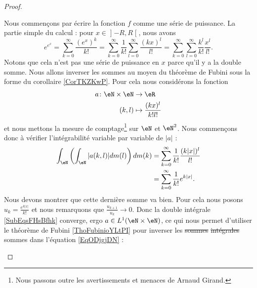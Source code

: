 \begin{proof}
\begin{enumerate}
                    Nous commençons par écrire la fonction \( f\) comme une série de puissance. La partie simple du calcul : pour \( x\in \mathopen] -R , R \mathclose[\), nous avons
                        \begin{equation}    \label{EqODjgjDN}
                        e^{e^x}=\sum_{k=0}^{\infty}\frac{ (e^x)^k }{ k! }=\sum_{k=0}^{\infty}\frac{1}{ k! }\sum_{l=0}^{\infty}\frac{ (kx)^l }{ l! }=\sum_{k=0}^{\infty}\sum_{l=0}^{\infty}\frac{k^l}{k! }\frac{ x^l }{ l! }.
                    \end{equation}
                    Notons que cela n'est pas une série de puissance en \( x\) parce qu'il y a la double somme. Nous allons inverser les sommes au moyen du théorème de Fubini sous la forme du corollaire \ref{CorTKZKwP}. Pour cela nous considérons la fonction
                    \begin{equation}
                        \begin{aligned}
                            a\colon \eN\times \eN&\to \eR \\
                            (k,l)&\mapsto \frac{ (kx)^l }{ k!l! } 
                        \end{aligned}
                    \end{equation}
                    et nous mettons la mesure de comptage\footnote{Nous passons outre les avertissements et menaces de Arnaud Girand.} sur \( \eN\) et \( \eN^2\). Nous commençons donc à vérifier l'intégrabilité variable par variable de \( | a |\) :
                    \begin{subequations}    \label{SubEqsFHsBfhk}
                        \begin{align}
                            \int_{\eN}\left( \int_{\eN}| a(k,l) |dm(l) \right)dm(k)&=\sum_{k=0}^{\infty}\frac{1}{ k! }\frac{ (k| x |)^l }{ l! }\\
                            &=\sum_{k=0}^{\infty}\frac{1}{ k! } e^{k| x |}.
                        \end{align}
                    \end{subequations}
                    Nous devons montrer que cette dernière somme va bien. Pour cela nous posons \( u_k=\frac{ e^{k| x |} }{ k! }\) et nous remarquons que \( \frac{ u_{k+1} }{ u_k }\to 0\). Donc la double intégrale \eqref{SubEqsFHsBfhk} converge, ergo \( a\in L^1(\eN\times \eN)\), ce qui nous permet d'utiliser le théorème de Fubini \ref{ThoFubinioYLtPI} pour inverser les \sout{sommes} \sout{intégrales} sommes dans l'équation \eqref{EqODjgjDN} :

\end{enumerate}
\end{proof}

